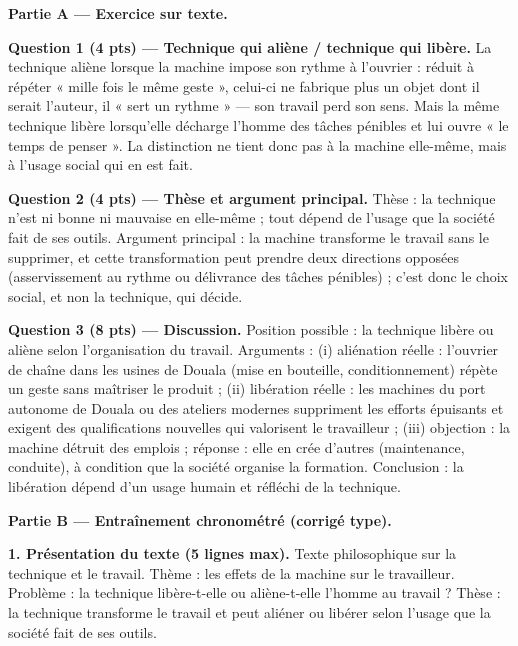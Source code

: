 \documentclass[11pt]{article}
\begin{document}
\begin{corrige}
\textbf{Partie A — Exercice sur texte.}

\textbf{Question 1 (4 pts) — Technique qui aliène / technique qui libère.} La technique aliène lorsque la machine impose son rythme à l'ouvrier : réduit à répéter « mille fois le même geste », celui-ci ne fabrique plus un objet dont il serait l'auteur, il « sert un rythme » — son travail perd son sens. Mais la même technique libère lorsqu'elle décharge l'homme des tâches pénibles et lui ouvre « le temps de penser ». La distinction ne tient donc pas à la machine elle-même, mais à l'usage social qui en est fait.

\textbf{Question 2 (4 pts) — Thèse et argument principal.} Thèse : la technique n'est ni bonne ni mauvaise en elle-même ; tout dépend de l'usage que la société fait de ses outils. Argument principal : la machine transforme le travail sans le supprimer, et cette transformation peut prendre deux directions opposées (asservissement au rythme ou délivrance des tâches pénibles) ; c'est donc le choix social, et non la technique, qui décide.

\textbf{Question 3 (8 pts) — Discussion.} Position possible : la technique libère ou aliène selon l'organisation du travail. Arguments : (i) aliénation réelle : l'ouvrier de chaîne dans les usines de Douala (mise en bouteille, conditionnement) répète un geste sans maîtriser le produit ; (ii) libération réelle : les machines du port autonome de Douala ou des ateliers modernes suppriment les efforts épuisants et exigent des qualifications nouvelles qui valorisent le travailleur ; (iii) objection : la machine détruit des emplois ; réponse : elle en crée d'autres (maintenance, conduite), à condition que la société organise la formation. Conclusion : la libération dépend d'un usage humain et réfléchi de la technique.

\textbf{Partie B — Entraînement chronométré (corrigé type).}

\textbf{1. Présentation du texte (5 lignes max).} Texte philosophique sur la technique et le travail. Thème : les effets de la machine sur le travailleur. Problème : la technique libère-t-elle ou aliène-t-elle l'homme au travail ? Thèse : la technique transforme le travail et peut aliéner ou libérer selon l'usage que la société fait de ses outils.


\end{corrige}
\end{document}
